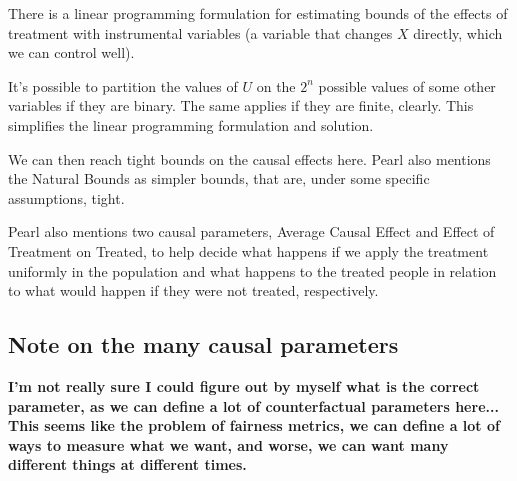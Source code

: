 There is a linear programming formulation for estimating bounds of the effects of treatment with instrumental variables (a variable that changes $X$ directly, which we can control well).

It's possible to partition the values of $U$ on the $2^n$ possible values of some other variables if they are binary. The same applies if they are finite, clearly. This simplifies the linear programming formulation and solution.

We can then reach tight bounds on the causal effects here. Pearl also mentions the Natural Bounds as simpler bounds, that are, under some specific assumptions, tight.

Pearl also mentions two causal parameters, Average Causal Effect and Effect of Treatment on Treated, to help decide what happens if we apply the treatment uniformly in the population and what happens to the treated people in relation to what would happen if they were not treated, respectively.



\subsection{Note on the many causal parameters}


\textbf{I'm not really sure I could figure out by myself what is the correct parameter, as we can define a lot of counterfactual parameters here... This seems like the problem of fairness metrics, we can define a lot of ways to measure what we want, and worse, we can want many different things at different times.}


